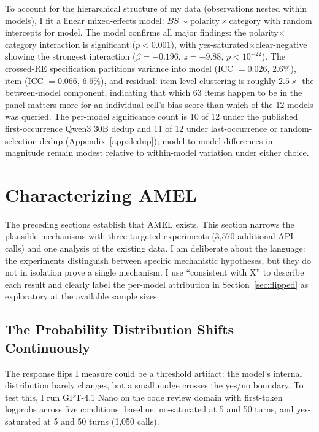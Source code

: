 \documentclass[10pt,twocolumn]{article}
\begin{document}
To account for the hierarchical structure of my data (observations nested within models), I fit a linear mixed-effects model: $BS \sim \text{polarity} \times \text{category}$ with random intercepts for model.
The model confirms all major findings: the polarity$\times$category interaction is significant ($p < 0.001$), with yes-saturated$\times$clear-negative showing the strongest interaction ($\beta = -0.196$, $z = -9.88$, $p < 10^{-22}$).
The crossed-RE specification partitions variance into model (ICC $= 0.026$, 2.6\%), item (ICC $= 0.066$, 6.6\%), and residual: item-level clustering is roughly $2.5\times$ the between-model component, indicating that which 63 items happen to be in the panel matters more for an individual cell's bias score than which of the 12 models was queried. The per-model significance count is 10 of 12 under the published first-occurrence Qwen3 30B dedup and 11 of 12 under last-occurrence or random-selection dedup (Appendix~\ref{app:dedup}); model-to-model differences in magnitude remain modest relative to within-model variation under either choice.


\section{Characterizing AMEL}
\label{sec:mechanism}

The preceding sections establish that AMEL exists.
This section narrows the plausible mechanisms with three targeted experiments (3,570 additional API calls) and one analysis of the existing data.
I am deliberate about the language: the experiments distinguish between specific mechanistic hypotheses, but they do not in isolation prove a single mechanism.
I use ``consistent with X'' to describe each result and clearly label the per-model attribution in Section~\ref{sec:flipped} as exploratory at the available sample sizes.

\subsection{The Probability Distribution Shifts Continuously}
\label{sec:logprobs}

The response flips I measure could be a threshold artifact: the model's internal distribution barely changes, but a small nudge crosses the yes/no boundary.
To test this, I run GPT-4.1 Nano on the code review domain with first-token logprobs across five conditions: baseline, no-saturated at 5 and 50 turns, and yes-saturated at 5 and 50 turns (1,050 calls).
\end{document}
